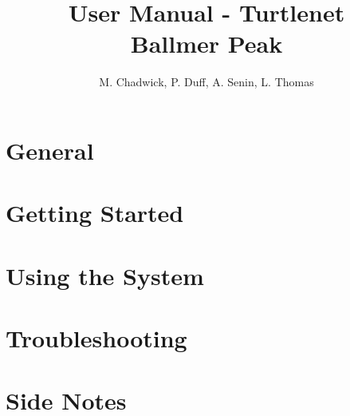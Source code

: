 \documentclass[openany]{book}
\title{User Manual - Turtlenet\\Ballmer Peak}
\author{M. Chadwick, P. Duff, A. Senin, L. Thomas}
\begin{document}
\maketitle
\tableofcontents

\chapter{General}


\chapter{Getting Started}


\chapter{Using the System}


\chapter{Troubleshooting}


\chapter{Side Notes}

\end{document}
